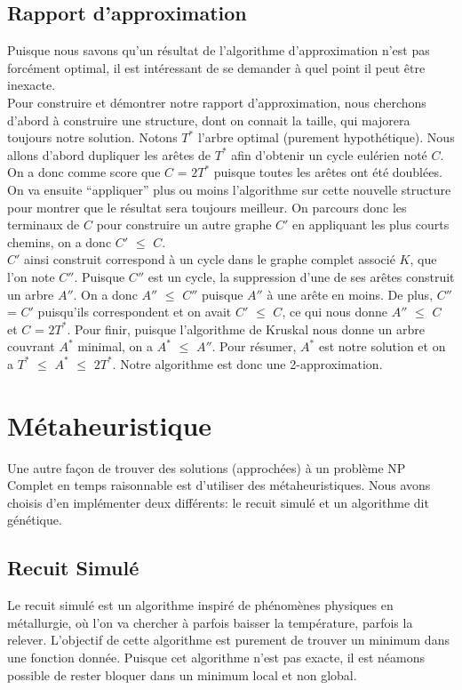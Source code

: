 \documentclass{article}
\begin{document}
\subsection{Rapport d'approximation}
Puisque nous savons qu'un résultat de l'algorithme d'approximation n'est pas forcément optimal, il est intéressant de se demander à quel point il peut être inexacte. \\ 
Pour construire et démontrer notre rapport d'approximation, nous cherchons d'abord à construire une structure, dont on connait la taille, qui majorera toujours notre solution. Notons $T^*$ l'arbre optimal (purement hypothétique). Nous allons d'abord dupliquer les arêtes de $T^*$ afin d'obtenir un cycle eulérien noté $C$. On a donc comme score que $C$ = $2T^*$ puisque toutes les arêtes ont été doublées. On va ensuite ``appliquer'' plus ou moins l'algorithme sur cette nouvelle structure pour montrer que le résultat sera toujours meilleur. On parcours donc les terminaux de $C$ pour construire un autre graphe $C'$ en appliquant les plus courts chemins, on a donc $C'$ $\leq$ $C$. \\
$C'$ ainsi construit correspond à un cycle dans le graphe complet associé $K$, que l'on note $C''$. Puisque $C''$ est un cycle, la suppression d'une de ses arêtes construit un arbre $A''$. On a donc $A''$ $\leq$ $C''$ puisque $A''$ à une arête en moins. De plus, $C''$ = $C'$ puisqu'ils correspondent et on avait $C'$ $\leq$ $C$, ce qui nous donne $A''$ $\leq$ $C$ et $C$ = $2T^*$. Pour finir, puisque l'algorithme de Kruskal nous donne un arbre couvrant $A^*$ minimal, on a  $A^*$ $\leq$ $A''$. Pour résumer, $A^*$  est notre solution et on a  $T^*$ $\leq$ $A^*$ $\leq$ $2T^*$. Notre algorithme est donc une 2-approximation.

\section{Métaheuristique}
Une autre façon de trouver des solutions (approchées) à un problème NP Complet en temps raisonnable est d'utiliser des métaheuristiques. Nous avons choisis d'en implémenter deux différents: le recuit simulé et un algorithme dit génétique.

\subsection{Recuit Simulé}
Le recuit simulé est un algorithme inspiré de phénomènes physiques en métallurgie, où l'on va chercher à parfois baisser la température, parfois la relever. L'objectif de cette algorithme est purement de trouver un minimum dans une fonction donnée. Puisque cet algorithme n'est pas exacte, il est néamons possible de rester bloquer dans un minimum local et non global. \\ \par 
\end{document}
